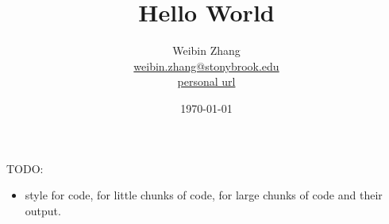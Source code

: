 \documentclass[tikz,10pt,oneside,a4paper]{report}
\title{Hello World}
\author{Weibin Zhang \\ \url{weibin.zhang@stonybrook.edu} \\ 
\url{personal url} }
\date{\today}
\begin{document}
\maketitle

\begin{multicols}{2}
    \tableofcontents\label{toc}    %
\end{multicols}


TODO:
\begin{itemize}
    \item style for code, for little chunks of code, for large chunks of code and their output.
\end{itemize}








% 
% 
\end{document}
